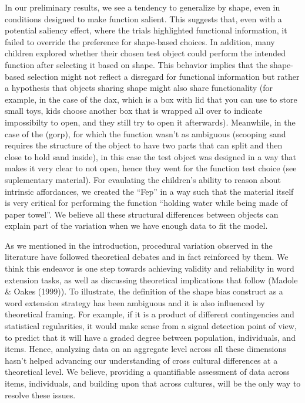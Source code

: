 \documentclass[10pt, letterpaper]{article}
\begin{document}
In our preliminary results, we see a tendency to generalize by shape,
even in conditions designed to make function salient. This suggests
that, even with a potential saliency effect, where the trials
highlighted functional information, it failed to override the preference
for shape-based choices. In addition, many children explored whether
their chosen test object could perform the intended function after
selecting it based on shape. This behavior implies that the shape-based
selection might not reflect a disregard for functional information but
rather a hypothesis that objects sharing shape might also share
functionality (for example, in the case of the dax, which is a box with
lid that you can use to store small toys, kids choose another box that
is wrapped all over to indicate impossibilty to open, and they still try
to open it afterwards). Meanwhile, in the case of the (gorp), for which
the function wasn't as ambiguous (scooping sand requires the structure
of the object to have two parts that can split and then close to hold
sand inside), in this case the test object was designed in a way that
makes it very clear to not open, hence they went for the function test
choice (see suplementary material). For evaulating the children's
ability to reason about intrinsic affordances, we created the ``Fep'' in
a way such that the material itself is very critical for performing the
function ``holding water while being made of paper towel''. We believe
all these structural differences between objects can explain part of the
variation when we have enough data to fit the model.

As we mentioned in the introduction, procedural variation observed in
the literature have followed theoretical debates and in fact reinforced
by them. We think this endeavor is one step towards achieving validity
and reliability in word extension tasks, as well as discussing
theoretical implications that follow (Madole \& Oakes (1999)). To
illustrate, the definition of the shape bias construct as a word
extension strategy has been ambiguous and it is also influenced by
theoretical framing. For example, if it is a product of different
contingencies and statistical regularities, it would make sense from a
signal detection point of view, to predict that it will have a graded
degree between population, individuals, and items. Hence, analyzing data
on an aggregate level across all these dimensions hasn't helped
advancing our understanding of cross cultural differences at a
theoretical level. We believe, providing a quantifiable assessment of
data across items, individuals, and building upon that across cultures,
will be the only way to resolve these issues.
\end{document}
